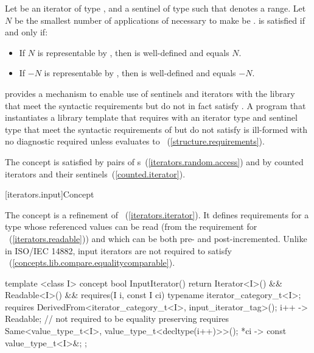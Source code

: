 \begin{itemdescr}
\pnum
Let  be an iterator of type , and 
a sentinel of type  such that  denotes a range.
Let $N$ be the smallest number of applications of 
necessary to make  be .
 is satisfied if and only if:

\begin{itemize}
\item If $N$ is representable by ,
      then  is well-defined and equals $N$.

\item If $-N$ is representable by ,
      then  is well-defined and equals $-N$.
\end{itemize}
\end{itemdescr}

\pnum
\enternote {} provides a mechanism to
enable use of sentinels and iterators with the library that meet the
syntactic requirements but do not in fact satisfy .
A program that instantiates a library template that requires
 with an iterator type  and sentinel type
 that meet the syntactic requirements of 
but do not satisfy  is ill-formed with no diagnostic required
unless  evaluates to
~(\ref{structure.requirements}). \exitnote

\pnum
\enternote The 
concept is satisfied by pairs of
s~(\ref{iterators.random.access}) and by
counted iterators and their sentinels~(\ref{counted.iterator}).\exitnote

[iterators.input]{Concept }

\pnum
The  concept is a refinement of
~(\ref{iterators.iterator}). It
defines requirements for a type whose referenced values can be read (from the requirement for
~(\ref{iterators.readable})) and which can be both pre- and post-incremented.
\enternote Unlike in ISO/IEC 14882, input iterators are not required to satisfy
~(\ref{concepts.lib.compare.equalitycomparable}).\exitnote

%
\begin{codeblock}
  template <class I>
  concept bool InputIterator() {
    return Iterator<I>() &&
      Readable<I>() &&
      requires(I i, const I ci) {
        typename iterator_category_t<I>;
        requires DerivedFrom<iterator_category_t<I>, input_iterator_tag>();
        { i++ } -> Readable; // not required to be equality preserving
        requires Same<value_type_t<I>, value_type_t<decltype(i++)>>();
        { *ci } -> const value_type_t<I>&;
      };
  }
\end{codeblock}

